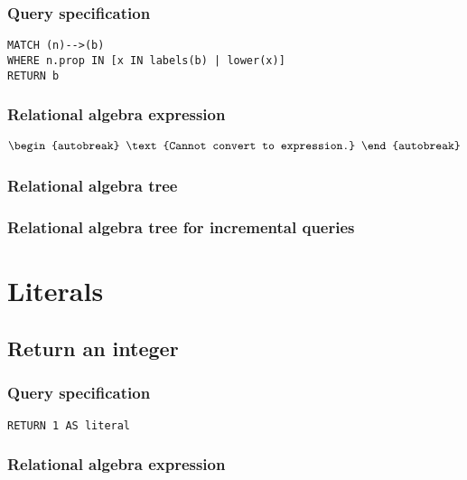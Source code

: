 \subsubsection*{Query specification}

\begin{lstlisting}
MATCH (n)-->(b)
WHERE n.prop IN [x IN labels(b) | lower(x)]
RETURN b
\end{lstlisting}

\subsubsection*{Relational algebra expression}

\begin{align*}
\begin{autobreak}
\text{Cannot convert to expression.}
\end{autobreak}
\end{align*}

\subsubsection*{Relational algebra tree}


\subsubsection*{Relational algebra tree for incremental queries}

\section{Literals}


\subsection{Return an integer}

\subsubsection*{Query specification}

\begin{lstlisting}
RETURN 1 AS literal
\end{lstlisting}

\subsubsection*{Relational algebra expression}

